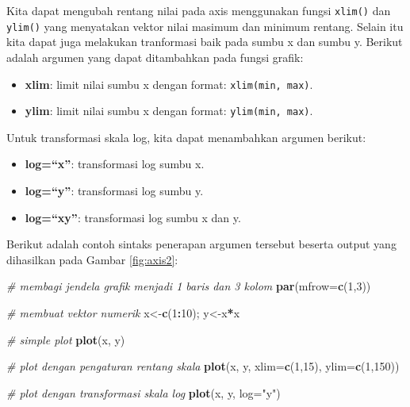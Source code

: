 \documentclass[]{book}
\newenvironment{Shaded}{\begin{snugshade}}{\end{snugshade}}
\newcommand{\KeywordTok}[1]{\textcolor[rgb]{0.13,0.29,0.53}{\textbf{#1}}}
\newcommand{\DataTypeTok}[1]{\textcolor[rgb]{0.13,0.29,0.53}{#1}}
\newcommand{\DecValTok}[1]{\textcolor[rgb]{0.00,0.00,0.81}{#1}}
\newcommand{\StringTok}[1]{\textcolor[rgb]{0.31,0.60,0.02}{#1}}
\newcommand{\CommentTok}[1]{\textcolor[rgb]{0.56,0.35,0.01}{\textit{#1}}}
\newcommand{\OperatorTok}[1]{\textcolor[rgb]{0.81,0.36,0.00}{\textbf{#1}}}
\newcommand{\NormalTok}[1]{#1}
\providecommand{\tightlist}{%
  \setlength{\itemsep}{0pt}\setlength{\parskip}{0pt}}
\begin{document}
Kita dapat mengubah rentang nilai pada axis menggunakan fungsi
\texttt{xlim()} dan \texttt{ylim()} yang menyatakan vektor nilai masimum
dan minimum rentang. Selain itu kita dapat juga melakukan tranformasi
baik pada sumbu x dan sumbu y. Berikut adalah argumen yang dapat
ditambahkan pada fungsi grafik:

\begin{itemize}
\tightlist
\item
  \textbf{xlim}: limit nilai sumbu x dengan format:
  \texttt{xlim(min,\ max)}.
\item
  \textbf{ylim}: limit nilai sumbu x dengan format:
  \texttt{ylim(min,\ max)}.
\end{itemize}

Untuk transformasi skala log, kita dapat menambahkan argumen berikut:

\begin{itemize}
\tightlist
\item
  \textbf{log=``x''}: transformasi log sumbu x.
\item
  \textbf{log=``y''}: transformasi log sumbu y.
\item
  \textbf{log=``xy''}: transformasi log sumbu x dan y.
\end{itemize}

Berikut adalah contoh sintaks penerapan argumen tersebut beserta output
yang dihasilkan pada Gambar \ref{fig:axis2}:

\begin{Shaded}
\begin{Highlighting}[]
\CommentTok{# membagi jendela grafik menjadi 1 baris dan 3 kolom}
\KeywordTok{par}\NormalTok{(}\DataTypeTok{mfrow=}\KeywordTok{c}\NormalTok{(}\DecValTok{1}\NormalTok{,}\DecValTok{3}\NormalTok{))}

\CommentTok{# membuat vektor numerik}
\NormalTok{x<-}\KeywordTok{c}\NormalTok{(}\DecValTok{1}\OperatorTok{:}\DecValTok{10}\NormalTok{); y<-x}\OperatorTok{*}\NormalTok{x}

\CommentTok{# simple plot}
\KeywordTok{plot}\NormalTok{(x, y)}

\CommentTok{# plot dengan pengaturan rentang skala}
\KeywordTok{plot}\NormalTok{(x, y, }\DataTypeTok{xlim=}\KeywordTok{c}\NormalTok{(}\DecValTok{1}\NormalTok{,}\DecValTok{15}\NormalTok{), }\DataTypeTok{ylim=}\KeywordTok{c}\NormalTok{(}\DecValTok{1}\NormalTok{,}\DecValTok{150}\NormalTok{))}

\CommentTok{# plot dengan transformasi skala log}
\KeywordTok{plot}\NormalTok{(x, y, }\DataTypeTok{log=}\StringTok{"y"}\NormalTok{)}
\end{Highlighting}
\end{Shaded}
\end{document}
